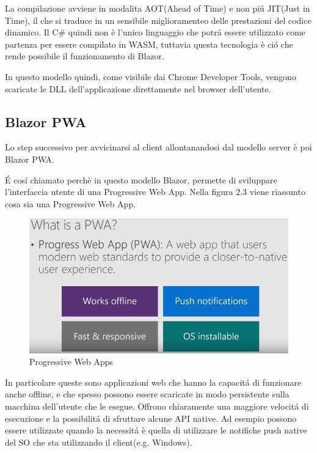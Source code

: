La compilazione avviene in modalita AOT(Ahead of Time) e non pi\'u JIT(Just in Time), il che si traduce in un sensibile miglioramenteo delle prestazioni del codice dinamico.
Il C\# quindi non \`e l'unico linguaggio che potr\'a essere utilizzato come partenza per essere compilato in WASM, tuttavia questa tecnologia \`e ci\'o che rende possibile il funzionamento di Blazor.

In questo modello quindi, come visibile dai Chrome Developer Tools, vengono scaricate le DLL dell'applicazione direttamente nel browser dell'utente.

\subsection{Blazor PWA}\label{sez:bpwa}
Lo step successivo per avvicinarsi al client allontanandosi dal modello server \`e poi Blazor PWA.

\'E cos\'i chiamato perch\`e in questo modello Blazor, permette di sviluppare l'interfaccia utente di una Progressive Web App.
Nella figura 2.3 viene riassunto cosa sia una Progressive Web App.

\begin{figure}[H]
	\centerline{\includegraphics[scale=0.5]{figure/ProgressiveWebApp.png}}
	\caption{Progressive Web Apps}
	\label{fig:WhatIsAPWA}
\end{figure}

In particolare queste sono applicazioni web che hanno la capacit\'a di funzionare anche offline, e che spesso possono essere scaricate in modo persistente sulla macchina dell'utente che le esegue.
Offrono chiaramente una maggiore velocit\'a di esecuzione e la possibilit\'a di sfruttare alcune API native.
Ad esempio possono essere utilizzate quando la necessit\'a \`e quella di utilizzare le notifiche push native del SO che sta utilizzando il client(e.g. Windows).

